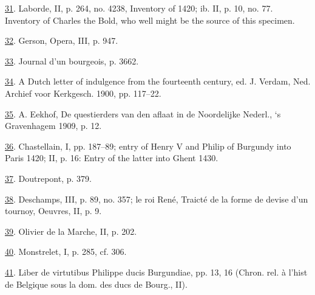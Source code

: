 \protect\hypertarget{23_NOTES.xhtmlux5cux23id_1210}{\protect\hyperlink{13_Chapter_Six__THE_DEPICTION_OF_TH.xhtmlux5cux23id_1209}{31}}.
Laborde, II, p. 264, no. 4238, Inventory of 1420; ib. II, p. 10, no. 77.
Inventory of Charles the Bold, who well might be the source of this
specimen.

\protect\hypertarget{23_NOTES.xhtmlux5cux23id_1208}{\protect\hyperlink{13_Chapter_Six__THE_DEPICTION_OF_TH.xhtmlux5cux23id_1207}{32}}.
Gerson, Opera, III, p. 947.

\protect\hypertarget{23_NOTES.xhtmlux5cux23id_1206}{\protect\hyperlink{13_Chapter_Six__THE_DEPICTION_OF_TH.xhtmlux5cux23id_1205}{33}}.
Journal d'un bourgeois, p. 3662.

\protect\hypertarget{23_NOTES.xhtmlux5cux23id_1204}{\protect\hyperlink{13_Chapter_Six__THE_DEPICTION_OF_TH.xhtmlux5cux23id_1203}{34}}.
A Dutch letter of indulgence from the fourteenth century, ed. J. Verdam,
Ned. Archief voor Kerkgesch. 1900, pp. 117--22.

\protect\hypertarget{23_NOTES.xhtmlux5cux23id_1202}{\protect\hyperlink{13_Chapter_Six__THE_DEPICTION_OF_TH.xhtmlux5cux23id_1201}{35}}.
A. Eekhof, De questierders van den aflaat in de Noordelijke Nederl., `s
Gravenhagem 1909, p. 12.

\protect\hypertarget{23_NOTES.xhtmlux5cux23id_1200}{\protect\hyperlink{13_Chapter_Six__THE_DEPICTION_OF_TH.xhtmlux5cux23id_1199}{36}}.
Chastellain, I, pp. 187--89; entry of Henry V and Philip of Burgundy
into Paris 1420; II, p. 16: Entry of the latter into Ghent 1430.

\protect\hypertarget{23_NOTES.xhtmlux5cux23id_1198}{\protect\hyperlink{13_Chapter_Six__THE_DEPICTION_OF_TH.xhtmlux5cux23id_1197}{37}}.
Doutrepont, p. 379.

\protect\hypertarget{23_NOTES.xhtmlux5cux23id_1196}{\protect\hyperlink{13_Chapter_Six__THE_DEPICTION_OF_TH.xhtmlux5cux23id_1195}{38}}.
Deschamps, III, p. 89, no. 357; le roi René, Traicté de la forme de
devise d'un tournoy, Oeuvres, II, p. 9.

\protect\hypertarget{23_NOTES.xhtmlux5cux23id_1194}{\protect\hyperlink{13_Chapter_Six__THE_DEPICTION_OF_TH.xhtmlux5cux23id_1193}{39}}.
Olivier de la Marche, II, p. 202.

\protect\hypertarget{23_NOTES.xhtmlux5cux23id_1192}{\protect\hyperlink{13_Chapter_Six__THE_DEPICTION_OF_TH.xhtmlux5cux23id_1191}{40}}.
Monstrelet, I, p. 285, cf. 306.

\protect\hypertarget{23_NOTES.xhtmlux5cux23id_1190}{\protect\hyperlink{13_Chapter_Six__THE_DEPICTION_OF_TH.xhtmlux5cux23id_1189}{41}}.
Liber de virtutibus Philippe ducis Burgundiae, pp. 13, 16 (Chron. rel. à
l'hist de Belgique sous la dom. des ducs de Bourg., II).

